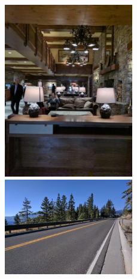 \documentclass[10pt,twocolumn,letterpaper]{article}
\newcommand{\threewidth}{2.22in}
\begin{document}
\begin{figure}[!]
  \includegraphics[width=\threewidth]{figures/images/IMG_20160830_175329.jpg}
  \includegraphics[width=\threewidth]{figures/images/IMG_20160830_172220.jpg}

\end{figure}
\end{document}
